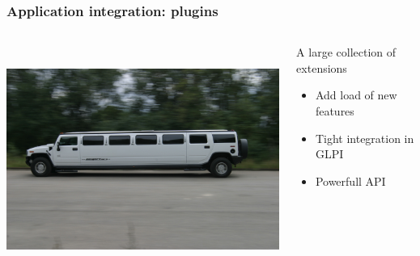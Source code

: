 \documentclass{beamer}
\begin{document}
\begin{frame}

    \frametitle{Application integration: plugins}

 \begin{columns}
 \begin{column}{0.45\textwidth}
         \includegraphics[height=7.5cm]{./pics/plugin.jpg}
 \end{column}
 \begin{column}{0.65\textwidth}
    \begin{block}{A large collection of \\
    extensions}
        \begin{itemize}
            \item Add load of new features
            \item Tight integration in GLPI
            \item Powerfull API
        \end{itemize}
    \end{block}

 \end{column}
\end{columns}





\end{frame}
\end{document}
